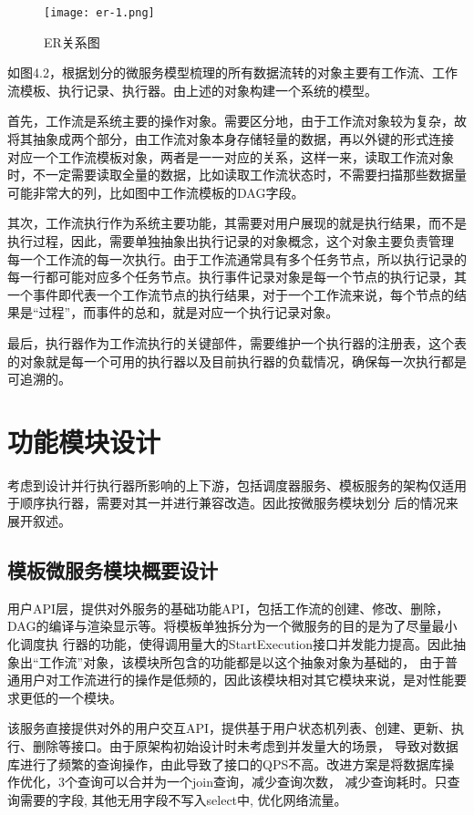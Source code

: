 \begin{figure}[H]
    \centering
    \texttt{[image: er-1.png]}
    \caption{ER关系图}
    \label{fig:ER关系图}
    \note{}
\end{figure}

如图4.2，根据划分的微服务模型梳理的所有数据流转的对象主要有工作流、工作流模板、执行记录、执行器。由上述的对象构建一个系统的模型。

首先，工作流是系统主要的操作对象。需要区分地，由于工作流对象较为复杂，故将其抽象成两个部分，由工作流对象本身存储轻量的数据，再以外键的形式连接
对应一个工作流模板对象，两者是一一对应的关系，这样一来，读取工作流对象时，不一定需要读取全量的数据，比如读取工作流状态时，不需要扫描那些数据量
可能非常大的列，比如图中工作流模板的DAG字段。

其次，工作流执行作为系统主要功能，其需要对用户展现的就是执行结果，而不是执行过程，因此，需要单独抽象出执行记录的对象概念，这个对象主要负责管理
每一个工作流的每一次执行。由于工作流通常具有多个任务节点，所以执行记录的每一行都可能对应多个任务节点。执行事件记录对象是每一个节点的执行记录，其
一个事件即代表一个工作流节点的执行结果，对于一个工作流来说，每个节点的结果是“过程”，而事件的总和，就是对应一个执行记录对象。

最后，执行器作为工作流执行的关键部件，需要维护一个执行器的注册表，这个表的对象就是每一个可用的执行器以及目前执行器的负载情况，确保每一次执行都是
可追溯的。

\section{功能模块设计}
考虑到设计并行执行器所影响的上下游，包括调度器服务、模板服务的架构仅适用于顺序执行器，需要对其一并进行兼容改造。因此按微服务模块划分
后的情况来展开叙述。


\subsection{模板微服务模块概要设计}

用户API层，提供对外服务的基础功能API，包括工作流的创建、修改、删除，DAG的编译与渲染显示等。将模板单独拆分为一个微服务的目的是为了尽量最小化调度执
行器的功能，使得调用量大的StartExecution接口并发能力提高。因此抽象出“工作流”对象，该模块所包含的功能都是以这个抽象对象为基础的，
由于普通用户对工作流进行的操作是低频的，因此该模块相对其它模块来说，是对性能要求更低的一个模块。

该服务直接提供对外的用户交互API，提供基于用户状态机列表、创建、更新、执行、删除等接口。由于原架构初始设计时未考虑到并发量大的场景，
导致对数据库进行了频繁的查询操作，由此导致了接口的QPS不高。改进方案是将数据库操作优化，3个查询可以合并为一个join查询，减少查询次数，
减少查询耗时。只查询需要的字段, 其他无用字段不写入select中, 优化网络流量。

